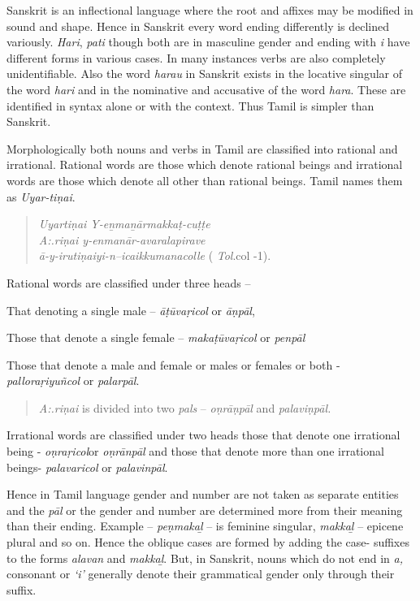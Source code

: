 Sanskrit is an inflectional language where the root and affixes may be modified in sound and shape. Hence in Sanskrit every word ending differently is declined variously. \textit{Hari}, \textit{pati} though both are in masculine gender and ending with \textit{i} have different forms in various cases. In many instances verbs are also completely unidentifiable. Also the word \textit{harau} in Sanskrit exists in the locative singular of the word \textit{hari} and in the nominative and accusative of the word \textit{hara}. These are identified in syntax alone or with the context. Thus Tamil is simpler than Sanskrit.

Morphologically both nouns and verbs in Tamil are classified into rational and irrational. Rational words are those which denote rational beings and irrational words are those which denote all other than rational beings. Tamil names them as \textit{Uyar-tiṇai}.

\begin{verse}
\textit{Uyartiṇai Y-eṉmaṉārmakkaṭ-cuṭṭe}\\\textit{ A:.riṇai y-enmanār-avaralapirave}\\\textit{ā-y-irutiṇaiyi-n--icaikkumanacolle} ( \textit{Tol}.col -1).
\end{verse}

Rational words are classified under three heads –

That denoting a single male – \textit{āṭūvaṛicol} or \textit{āṇpāl},

Those that denote a single female – \textit{makaṭūvaṛicol} or \textit{penpāl}

 Those that denote a male and female or males or females or both - \textit{palloraṛiyuñcol} or \textit{palarpāl}.

\begin{verse}
\textit{A:.riṇai} is divided into two \textit{pals} – \textit{oṇrāṇpāl} and \textit{palaviṇpāl.}
\end{verse}

Irrational words are classified under two heads those that denote one irrational being - \textit{oṇraṛicol}or \textit{oṇrānpāl} and those that denote more than one irrational beings- \textit{palavaricol} or \textit{palavinpāl}.

Hence in Tamil language gender and number are not taken as separate entities and the \textit{pāl} or the gender and number are determined more from their meaning than their ending. Example – \textit{peṇmakaḻ} – is feminine singular, \textit{makkaḻ} – epicene plural and so on. Hence the oblique cases are formed by adding the case- suffixes to the forms \textit{alavan} and \textit{makkaḻ}. But, in Sanskrit, nouns which do not end in \textit{a,} consonant or \textit{‘i’} generally denote their grammatical gender only through their suffix.

